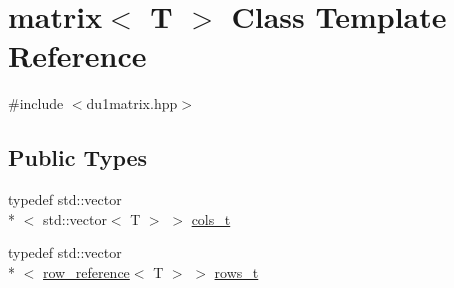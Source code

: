 \hypertarget{classmatrix}{\section{matrix$<$ T $>$ Class Template Reference}
\label{classmatrix}
}


{\ttfamily \#include $<$du1matrix.\-hpp$>$}

\subsection*{Public Types}
\begin{DoxyCompactItemize}
\item 
typedef std\-::vector\\*
$<$ std\-::vector$<$ T $>$ $>$ \hyperlink{classmatrix_a33705bb22bd2ff26ab7e8af05f15569e}{cols\-\_\-t}
\item 
typedef std\-::vector\\*
$<$ \hyperlink{classrow__reference}{row\-\_\-reference}$<$ T $>$ $>$ \hyperlink{classmatrix_af8b068298be5fe588a7911bf82fc82bb}{rows\-\_\-t}
\end{DoxyCompactItemize}
